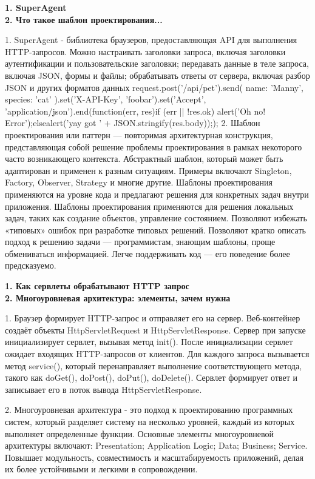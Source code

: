 \documentclass{article}
\begin{document}
\begin{minipage}{.3\textwidth}
    \textbf{1. SuperAgent}\\
    \textbf{2. Что такое шаблон проектирования...}

1. SuperAgent - библиотека браузеров, предоставляющая API для выполнения HTTP-запросов. Можно настраивать заголовки запроса, включая заголовки аутентификации и пользовательские заголовки; передавать данные в теле запроса, включая JSON, формы и файлы; обрабатывать ответы от сервера, включая разбор JSON и других форматов данных
request.post('/api/pet').send({ name: 'Manny', species: 'cat' }).set('X-API-Key', 'foobar').set('Accept', 'application/json').end(function(err, res){if (err || !res.ok) {alert('Oh no! Error');}else{alert('yay got ' + JSON.stringify(res.body));}});
2. Шаблон проектирования или паттерн — повторимая архитектурная конструкция, представляющая собой решение проблемы проектирования в рамках некоторого часто возникающего контекста. Абстрактный шаблон, который может быть адаптирован и применен к разным ситуациям.
Примеры включают Singleton, Factory, Observer, Strategy и многие другие. Шаблоны проектирования применяются на уровне кода и предлагают решения для конкретных задач внутри приложения.
Шаблоны проектирования применяются для решения локальных задач, таких как создание объектов, управление состоянием. Позволяют избежать «типовых» ошибок при разработке типовых решений.
Позволяют кратко описать подход к решению задачи — программистам, знающим шаблоны, проще обмениваться информацией.
Легче поддерживать код — его поведение более предсказуемо.
\end{minipage}
\hfill
\begin{minipage}{.3\textwidth}
    \textbf{1. Как сервлеты обрабатывают HTTP запрос}\\
    \textbf{2. Многоуровневая архитектура: элементы, зачем нужна}

1. Браузер формирует HTTP-запрос и отправляет его на сервер. Веб-контейнер создаёт объекты HttpServletRequest и HttpServletResponse. Сервер при запуске инициализирует сервлет, вызывая метод init(). После инициализации сервлет ожидает входящих HTTP-запросов от клиентов.
Для каждого запроса вызывается метод service(), который перенаправляет выполнение соответствующего метода, такого как doGet(), doPost(), doPut(), doDelete(). Сервлет формирует ответ и записывает его в поток вывода HttpServletResponse. 

2. Многоуровневая архитектура - это подход к проектированию программных систем, который разделяет систему на несколько уровней, каждый из которых выполняет определенные функции. Основные элементы многоуровневой архитектуры включают: Presentation; Application Logic; Data; Business; Service.
Повышает модульность, совместимость и масштабируемость приложений, делая их более устойчивыми и легкими в сопровождении.
\end{minipage}
\end{document}
